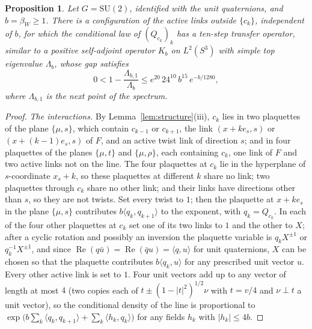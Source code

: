 \documentclass[aps,prd,twocolumn,superscriptaddress,nofootinbib,longbibliography,floatfix,amsmath,amssymb,10pt]{revtex4-2}
\newtheorem{proposition}[theorem]{Proposition}
\theoremstyle{definition}
\theoremstyle{remark}
\newcommand{\SU}{\mathrm{SU}}
\newcommand{\ip}[2]{\langle #1,#2\rangle}
\begin{document}
\begin{proposition}\label{prop:slowline}
Let $G=\SU(2)$, identified with the unit quaternions, and $b=\beta_W\ge1$.
There is a configuration of the active links outside $\{c_k\}$, independent
of $b$, for which the conditional law of $(Q_{c_k})_k$ has a ten-step
transfer operator, similar to a positive self-adjoint operator $K_b$ on
$L^2(S^3)$ with simple top eigenvalue $\Lambda_b$, whose gap satisfies
\[
0<1-\frac{\Lambda_{b,1}}{\Lambda_b}\le e^{20}\,24^{10}\,b^{15}\,e^{-b/1280},
\]
where $\Lambda_{b,1}$ is the next point of the spectrum.
\end{proposition}

\begin{proof}
\emph{The interactions.} By Lemma~\ref{lem:structure}(iii), $c_k$ lies in
two plaquettes of the plane $\{\mu,s\}$, which contain $c_{k-1}$ or
$c_{k+1}$, the link $(x+ke_s,s)$ or $(x+(k-1)e_s,s)$ of $F$, and an active
twist link of direction $s$; and in four plaquettes of the planes
$\{\mu,t\}$ and $\{\mu,\rho\}$, each containing $c_k$, one link of $F$ and
two active links not on the line. The four plaquettes at $c_k$ lie in the
hyperplane of $s$-coordinate $x_s+k$, so these plaquettes at different $k$
share no link; two plaquettes through $c_k$ share no other link; and their
links have directions other than $s$, so they are not twists. Set every
twist to $1$; then the plaquette at $x+ke_s$ in the plane $\{\mu,s\}$
contributes $b\ip{q_k}{q_{k+1}}$ to the exponent, with $q_k=Q_{c_k}$. In each
of the four other plaquettes at $c_k$ set one of its two links to $1$ and the
other to $X$; after a cyclic rotation and possibly an inversion the plaquette
variable is $q_kX^{\pm1}$ or $q_k^{-1}X^{\pm1}$, and since $\operatorname{Re}
(q\bar u)=\operatorname{Re}(\bar qu)=\ip qu$ for unit quaternions, $X$ can be
chosen so that the plaquette contributes $b\ip{q_k}u$ for any prescribed unit
vector $u$. Every other active link is set to $1$. Four unit vectors add up
to any vector of length at most $4$ (two copies each of $t\pm(1-|t|^2)^{1/2}
\nu$ with $t=v/4$ and $\nu\perp t$ a unit vector), so the conditional density
of the line is proportional to $\exp\bigl(b\sum_k\ip{q_k}{q_{k+1}}+\sum_k\ip
{h_k}{q_k}\bigr)$ for any fields $h_k$ with $|h_k|\le4b$.


\end{proof}
\end{document}
